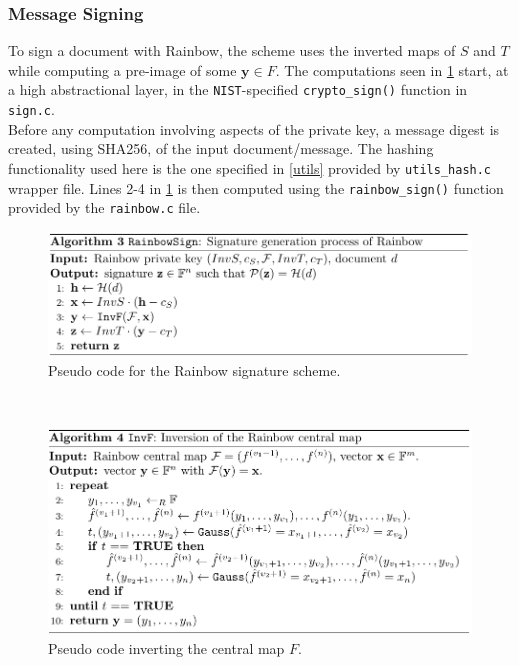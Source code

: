 \subsubsection{Message Signing} \label{section:message_sign}
To sign a document with Rainbow, the scheme uses the inverted maps of $S$ and $T$ while computing a pre-image of some $\textbf{y} \in F$. The computations seen in \cref{rainbowsign} start, at a high abstractional layer, in the \texttt{NIST}-specified \texttt{crypto\_sign()} function in \texttt{sign.c}.\medskip\\
Before any computation involving aspects of the private key, a message digest is created, using SHA256, of the input document/message. The hashing functionality used here is the one specified in \cref{utils} provided by \texttt{utils\_hash.c} wrapper file. Lines 2-4 in \cref{rainbowsign} is then computed using the \texttt{rainbow\_sign()} function provided by the \texttt{rainbow.c} file.
\begin{figure}[t]
    \centering
    \includegraphics[width=\textwidth]{resources/rainbowsign.png}
    \caption{Pseudo code for the Rainbow signature scheme.}
    \label{rainbowsign}
\end{figure}\\
\begin{figure}[t]
    \centering
    \includegraphics[width=\textwidth]{resources/rainbowinvf.png}
    \caption{Pseudo code inverting the central map $F$.}
    \label{rainbowinvf}
\end{figure}
